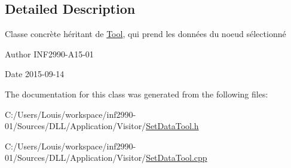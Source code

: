 \subsection{Detailed Description}
Classe concrète héritant de \hyperlink{class_tool}{Tool}, qui prend les données du noeud sélectionné 

\begin{DoxyAuthor}{Author}
I\+N\+F2990-\/\+A15-\/01 
\end{DoxyAuthor}
\begin{DoxyDate}{Date}
2015-\/09-\/14 
\end{DoxyDate}


The documentation for this class was generated from the following files\+:\begin{DoxyCompactItemize}
\item 
C\+:/\+Users/\+Louis/workspace/inf2990-\/01/\+Sources/\+D\+L\+L/\+Application/\+Visitor/\hyperlink{_set_data_tool_8h}{Set\+Data\+Tool.\+h}\item 
C\+:/\+Users/\+Louis/workspace/inf2990-\/01/\+Sources/\+D\+L\+L/\+Application/\+Visitor/\hyperlink{_set_data_tool_8cpp}{Set\+Data\+Tool.\+cpp}\end{DoxyCompactItemize}
